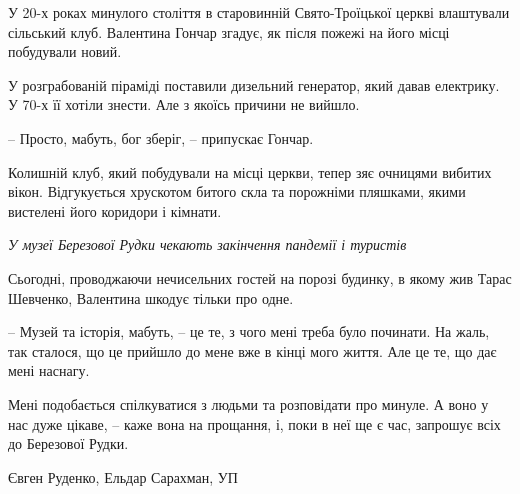 У 20-х роках минулого століття в старовинній Свято-Троїцької церкві влаштували сільський клуб. Валентина Гончар згадує, як після пожежі на його місці побудували новий.

У розграбованій піраміді поставили дизельний генератор, який давав електрику. У 70-х її хотіли знести. Але з якоїсь причини не вийшло.

– Просто, мабуть, бог зберіг, – припускає Гончар.

Колишній клуб, який побудували на місці церкви, тепер зяє очницями вибитих вікон. Відгукується хрускотом битого скла та порожніми пляшками, якими вистелені його коридори і кімнати.

\emph{У музеї Березової Рудки чекають закінчення пандемії і туристів}

Сьогодні, проводжаючи нечисельних гостей на порозі будинку, в якому жив Тарас
Шевченко, Валентина шкодує тільки про одне.

– Музей та історія, мабуть, – це те, з чого мені треба було починати. На жаль,
так сталося, що це прийшло до мене вже в кінці мого життя. Але це те, що дає
мені наснагу. 

Мені подобається спілкуватися з людьми та розповідати про минуле. А воно у нас
дуже цікаве, – каже вона на прощання, і, поки в неї ще є час, запрошує всіх до
Березової Рудки.

Євген Руденко, Ельдар Сарахман, УП
